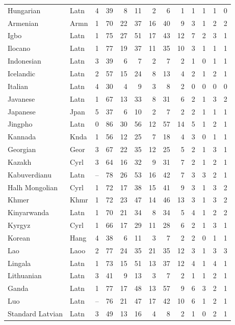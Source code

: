 \begin{small}
\begin{longtable}{llrrrrrrrrrrr}
Hungarian & Latn & 4 & 39 & 8 & 11 & 2 & 6 & 1 & 1 & 1 & 1 & 0 \\
Armenian & Armn & 1 & 70 & 22 & 37 & 16 & 40 & 9 & 3 & 1 & 2 & 2 \\
Igbo & Latn & 1 & 75 & 27 & 51 & 17 & 43 & 12 & 7 & 2 & 3 & 1 \\
Ilocano & Latn & 1 & 77 & 19 & 37 & 11 & 35 & 10 & 3 & 1 & 1 & 1 \\
Indonesian & Latn & 3 & 39 & 6 & 7 & 2 & 7 & 2 & 1 & 0 & 1 & 1 \\
Icelandic & Latn & 2 & 57 & 15 & 24 & 8 & 13 & 4 & 2 & 1 & 2 & 1 \\
Italian & Latn & 4 & 30 & 4 & 9 & 3 & 8 & 2 & 0 & 0 & 0 & 0 \\
Javanese & Latn & 1 & 67 & 13 & 33 & 8 & 31 & 6 & 2 & 1 & 3 & 2 \\
Japanese & Jpan & 5 & 37 & 6 & 10 & 2 & 7 & 2 & 2 & 1 & 1 & 1 \\
Jingpho & Latn & 0 & 86 & 30 & 56 & 12 & 57 & 14 & 5 & 1 & 2 & 1 \\
Kannada & Knda & 1 & 56 & 12 & 25 & 7 & 18 & 4 & 3 & 0 & 1 & 1 \\
Georgian & Geor & 3 & 67 & 22 & 35 & 12 & 25 & 5 & 2 & 1 & 3 & 1 \\
Kazakh & Cyrl & 3 & 64 & 16 & 32 & 9 & 31 & 7 & 2 & 1 & 2 & 1 \\
Kabuverdianu & Latn & -- & 78 & 26 & 53 & 16 & 42 & 7 & 3 & 3 & 2 & 1 \\
Halh Mongolian & Cyrl & 1 & 72 & 17 & 38 & 15 & 41 & 9 & 3 & 1 & 3 & 2 \\
Khmer & Khmr & 1 & 72 & 23 & 47 & 14 & 46 & 13 & 3 & 1 & 3 & 2 \\
Kinyarwanda & Latn & 1 & 70 & 21 & 34 & 8 & 34 & 5 & 4 & 1 & 2 & 2 \\
Kyrgyz & Cyrl & 1 & 66 & 17 & 29 & 11 & 28 & 6 & 2 & 1 & 3 & 1 \\
Korean & Hang & 4 & 38 & 6 & 11 & 3 & 7 & 2 & 2 & 0 & 1 & 1 \\
Lao & Laoo & 2 & 77 & 24 & 35 & 21 & 35 & 12 & 3 & 1 & 3 & 3 \\
Lingala & Latn & 1 & 73 & 15 & 51 & 13 & 37 & 12 & 4 & 1 & 4 & 1 \\
Lithuanian & Latn & 3 & 41 & 9 & 13 & 3 & 7 & 2 & 1 & 1 & 2 & 1 \\
Ganda & Latn & 1 & 77 & 17 & 48 & 13 & 57 & 9 & 6 & 3 & 2 & 1 \\
Luo & Latn & -- & 76 & 21 & 47 & 17 & 42 & 10 & 6 & 1 & 2 & 1 \\
Standard Latvian & Latn & 3 & 49 & 13 & 16 & 4 & 8 & 2 & 1 & 0 & 2 & 1 \\

\end{longtable}
\end{small}
